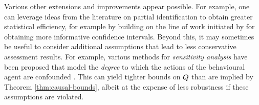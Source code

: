 




Various other extensions and improvements appear possible.
For example, 
one can leverage ideas from the literature on partial identification \citep{manski2003partial} to obtain greater statistical efficiency, for example by building on the line of work initiated by \cite{imbens2004confidence} for obtaining more informative confidence intervals.
Beyond this, it may sometimes be useful to consider additional assumptions that lead to less conservative assessment results.
For example, various methods for \emph{sensitivity analysis} have been proposed that model the \emph{degree} to which the actions of the behavioural agent are confounded \citep{rosenbaum2002observational,tan2006distributional,yadlowsky2022bounds}.
This can yield tighter bounds on $Q$ than are implied by Theorem \ref{thm:causal-bounds}, albeit at the expense of less robustness if these assumptions are violated.


